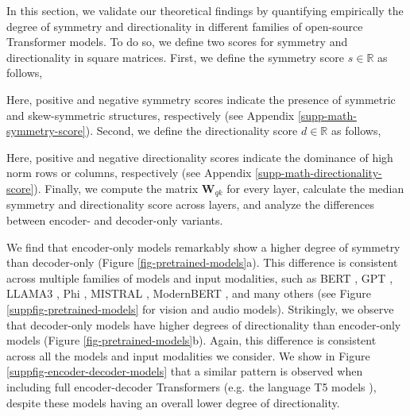 In this section, we validate our theoretical findings by quantifying empirically the degree of symmetry and directionality in different families of open-source Transformer models.
%
To do so, we define two scores for symmetry and directionality in square matrices.
%
First, we define the symmetry score $s \in \mathbb{R}$ as follows,
%

%
Here, positive and negative symmetry scores indicate the presence of symmetric and skew-symmetric structures, respectively (see Appendix \ref{supp-math-symmetry-score}).
%
Second, we define the directionality score $d \in \mathbb{R}$ as follows,
%

%
Here, positive and negative directionality scores indicate the dominance of high norm rows or columns, respectively (see Appendix \ref{supp-math-directionality-score}).
%
Finally, we compute the matrix $\bm{W}_{qk}$ for every layer, calculate the median symmetry and directionality score across layers, and analyze the differences between encoder- and decoder-only variants.

We find that encoder-only models remarkably show a higher degree of symmetry than decoder-only (Figure \ref{fig-pretrained-models}a).
%
This difference is consistent across multiple families of models and input modalities, such as BERT \citep{devlinBERTPretrainingDeep2019}, GPT \citep{radfordImprovingLanguageUnderstanding2018, radfordLanguageModelsAre2019}, LLAMA3 \citep{touvronLLaMAOpenEfficient2023}, Phi \citep{hughesPhi2SurprisingPower2023,abdinPhi3TechnicalReport2024}, MISTRAL \citep{jiangMistral7B2023}, ModernBERT \citep{warnerSmarterBetterFaster2024}, and many others (see Figure \ref{suppfig-pretrained-models} for vision and audio models).
%
Strikingly, we observe that decoder-only models have higher degrees of directionality than encoder-only models (Figure \ref{fig-pretrained-models}b).
%
Again, this difference is consistent across all the models and input modalities we consider. 
%
We show in Figure \ref{suppfig-encoder-decoder-models} that a similar pattern is observed when including full encoder-decoder Transformers (e.g. the language T5 models \citep{xueMT5MassivelyMultilingual2021}), despite these models having an overall lower degree of directionality.